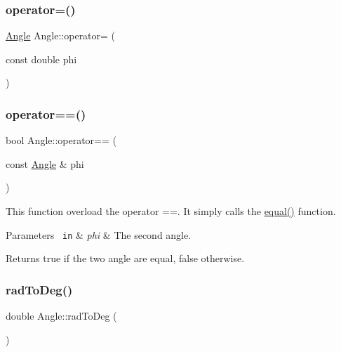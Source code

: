 \subsubsection{\texorpdfstring{operator=()}{operator=()}\hspace{0.1cm}{\footnotesize\ttfamily [2/2]}}
{\footnotesize\ttfamily \mbox{\hyperlink{class_angle}{Angle}} Angle\+::operator= (\begin{DoxyParamCaption}\item[{const double}]{phi }\end{DoxyParamCaption})\hspace{0.3cm}{\ttfamily [inline]}}

\mbox{\label{class_angle_affdc9a2590df21c00fcbe01e5dadaf25}} 
\subsubsection{\texorpdfstring{operator==()}{operator==()}}
{\footnotesize\ttfamily bool Angle\+::operator== (\begin{DoxyParamCaption}\item[{const \mbox{\hyperlink{class_angle}{Angle}} \&}]{phi }\end{DoxyParamCaption})\hspace{0.3cm}{\ttfamily [inline]}}

This function overload the operator ==. It simply calls the {\ttfamily \mbox{\hyperlink{class_angle_a56b3dfe127d0abc16db14bd22ed4b5b4}{equal()}}} function. 
\begin{DoxyParams}[1]{Parameters}
\mbox{\texttt{ in}}  & {\em phi} & The second angle. \\
\hline
\end{DoxyParams}
\begin{DoxyReturn}{Returns}
{\ttfamily true} if the two angle are equal, {\ttfamily false} otherwise. 
\end{DoxyReturn}
\mbox{\label{class_angle_a8d7691e304041c8deafdec82497a781f}} 
\subsubsection{\texorpdfstring{radToDeg()}{radToDeg()}}
{\footnotesize\ttfamily double Angle\+::rad\+To\+Deg (\begin{DoxyParamCaption}{ }\end{DoxyParamCaption})\hspace{0.3cm}{\ttfamily [inline]}}



